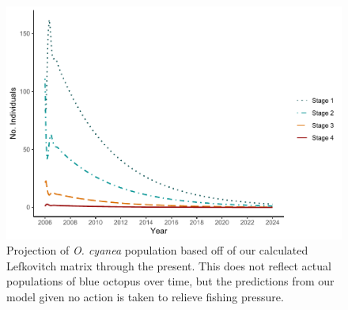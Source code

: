\documentclass[
]{article}
\begin{document}
\begin{figure}
\centering
\includegraphics{Wulfing_CH1_ReSubmission_files/figure-latex/projection-1.pdf}
\caption{\label{fig:projection}Projection of \emph{O. cyanea} population based off of our calculated Lefkovitch matrix through the present. This does not reflect actual populations of blue octopus over time, but the predictions from our model given no action is taken to relieve fishing pressure. \label{projection}}
\end{figure}

\begin{table}

\caption{\label{tab:lifetable}Stable stage distribution and reproductive value of each stage of this blue octopus population matrix given in Figure \ref{WriteMtxRounded}. The survivability (i.e.~the proportion of individuals who survive from stage i to stage i+1) in each stage includes death rate from fishing. Stages 1-4 survivability were calculated by summing up the proportion of individuals surviving and staying within a stage every month (\(P_i\)) and the proportion of individuals surviving and growing every month (\(G_i\)). Larval survivability of 0.0001328 was calculated by dividing our estimated number of larvae surviving back to stage 1 (\(F_4\)) by the average estimated reproductive output of \emph{O. cyanea}. \label{lifetable}}
\centering
{}
\end{table}
\end{document}
